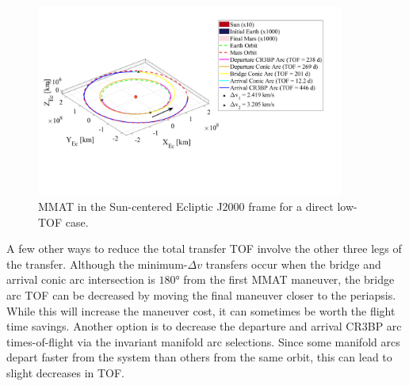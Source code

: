 \begin{figure}[!htb]
    \centering
    \includegraphics[width=0.9\textwidth]{figures/DirectMinTOFMMAT.pdf}
    \caption{MMAT in the Sun-centered Ecliptic J2000 frame for a direct low-TOF case.}
    \label{fig:directMinTOFMMAT}
\end{figure}

A few other ways to reduce the total transfer TOF involve the other three legs of the transfer.
Although the minimum-$\Delta v$ transfers occur when the bridge and arrival conic arc intersection
is $\ang{180}$ from the first MMAT maneuver, the bridge arc TOF can be decreased by moving the
final maneuver closer to the periapsis. While this will increase the maneuver cost, it can
sometimes be worth the flight time savings. Another option is to decrease the departure and arrival
CR3BP arc times-of-flight via the invariant manifold arc selections. Since some manifold arcs
depart faster from the system than others from the same orbit, this can lead to slight decreases in
TOF.

